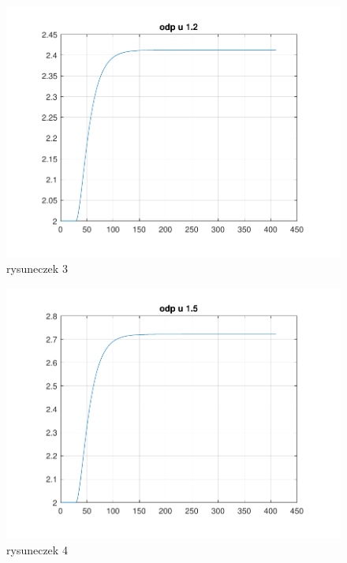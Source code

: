 \begin{figure}[H]
    \centering
    \includegraphics[scale=0.8]{../projekt/zad2/img/odp_u_1_2.pdf}
    \caption{rysuneczek 3}
\end{figure}
\begin{figure}[H]
    \centering
    \includegraphics[scale=0.8]{../projekt/zad2/img/odp_u_1_5.pdf}
    \caption{rysuneczek 4}
\end{figure}
